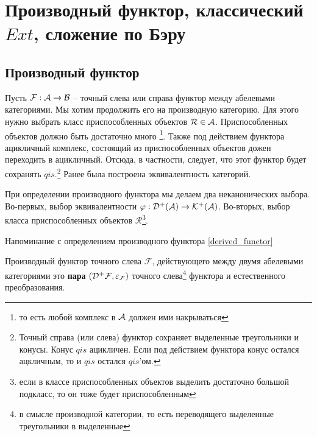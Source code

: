 \documentclass[../main.tex]{subfiles}
\begin{document}
\section{Производный функтор, классический $Ext$, сложение по Бэру}
\subsection{Производный функтор}
Пусть $\mathcal{F}: \mathcal{A} \rightarrow \mathcal{B}$ -- точный слева или справа функтор между абелевыми категориями. Мы хотим продолжить его на производную категорию. Для этого нужно выбрать класс приспособленных объектов $\mathcal{R} \in \mathcal{A}$. Приспособленных объектов должно быть достаточно много \footnote{то есть любой комплекс в $\mathcal{A}$ должен ими накрываться}. Также под действием функтора ацикличный комплекс, состоящий из приспособленных объектов дожен переходить в ацикличный. Отсюда, в частности, следует, что этот функтор будет сохранять $qis$.\footnote{Точный справа (или слева) функтор сохраняет выделенные треугольники и конусы. Конус $qis$ ацикличен. Если под действием функтора конус остался ацкличным, то и $qis$ остался $qis$'ом.}
Ранее была построена эквивалентность категорий.
\bee
{}
\eee
\bee
{}
\eee
\begin{to_com}
При определении производного функтора мы делаем два неканонических  выбора. Во-первых, выбор эквивалентности $\varphi: \mathcal{D^+(A)} \rightarrow \mathcal{K^+(A)}$. Во-вторых, выбор класса приспособленных объектов $\mathcal{R}$\footnote{если в классе приспособленных объектов выделить достаточно большой подкласс, то он тоже будет приспособленным}.
\end{to_com}
Напоминание с определением производного функтора \ref{derived_functor}
\begin{to_def}
Производный функтор точного слева $\mathcal{F}$, действующего между двумя абелевыми категориями это \textbf{пара} $(\mathcal{D^+ F}, \varepsilon_{\mathcal{F}})$ точного слева\footnote{в смысле производной категории, то есть переводящего выделенные треугольники в выделенные} функтора и естественного преобразования.\\
\bee
{}
\eee
\bee
{}
\eee
\end{to_def}
\end{document}
